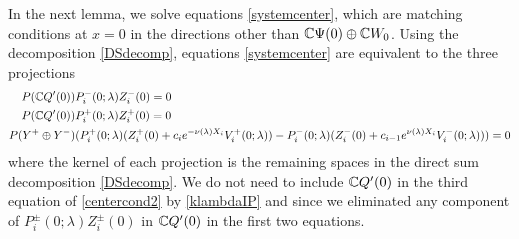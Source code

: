 \documentclass[10pt,reqno]{amsart}
\theoremstyle{plain}
\theoremstyle{definition}
\theoremstyle{remark}
\numberwithin{theorem}{section}
\numberwithin{equation}{section}
\begin{document}
In the next lemma, we solve equations \cref{systemcenter}, which are matching conditions at $x = 0$ in the directions other than $\mathbb{C} \Psi(0) \oplus \mathbb{C} W_0$. Using the decomposition \cref{DSdecomp}, equations \cref{systemcenter} are equivalent to the three projections
\begin{equation}\label{centercond2}
\begin{aligned}
P(\mathbb{C} Q'(0) ) &P_i^-(0; \lambda) Z_i^-(0) = 0 \\
P(\mathbb{C} Q'(0) ) &P_i^+(0; \lambda) Z_i^+(0) = 0 \\
P(Y^+ \oplus Y^-) &( P_i^+(0; \lambda)(Z_i^+(0) + c_i e^{-\nu(\lambda)X_i}V_i^+(0; \lambda)) - P_i^-(0; \lambda) (Z_i^-(0) + c_{i-1} e^{\nu(\lambda)X_i} V_i^-(0; \lambda)) ) = 0
\end{aligned}
\end{equation}
where the kernel of each projection is the remaining spaces in the direct sum decomposition \eqref{DSdecomp}. We do not need to include $\mathbb{C} Q'(0)$ in the third equation of \eqref{centercond2} by \cref{klambdaIP} and since we eliminated any component of $P_i^\pm(0; \lambda) Z_i^\pm(0)$ in $\mathbb{C} Q'(0)$ in the first two equations.
\end{document}
